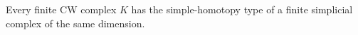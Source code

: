 Every finite CW complex $K$ has the simple-homotopy type of a finite simplicial complex of the same dimension.

